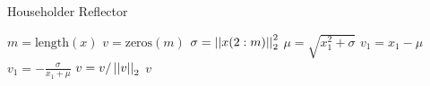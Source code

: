 \begin{algorithm}[t]
\caption{Householder Reflector}
\label{alg:unit_house}
\begin{algorithmic}[1]
\State $m = \text{length}(x)$
\State $v = \text{zeros}(m)$
\State $\sigma = \left| \left| x(2:m) \right| \right|_{2}^{2}$
\State $\mu = \sqrt{x_{1}^{2} + \sigma}$
    \State $v_{1} = x_{1} - \mu$
\Else
    \State $v_{1} = -\frac{\sigma}{x_{1} + \mu}$
\EndIf
\State $v = v/\left| \left| v \right| \right|_{2}$
\State \Return $v$
\EndFunction
\end{algorithmic}
\end{algorithm}
